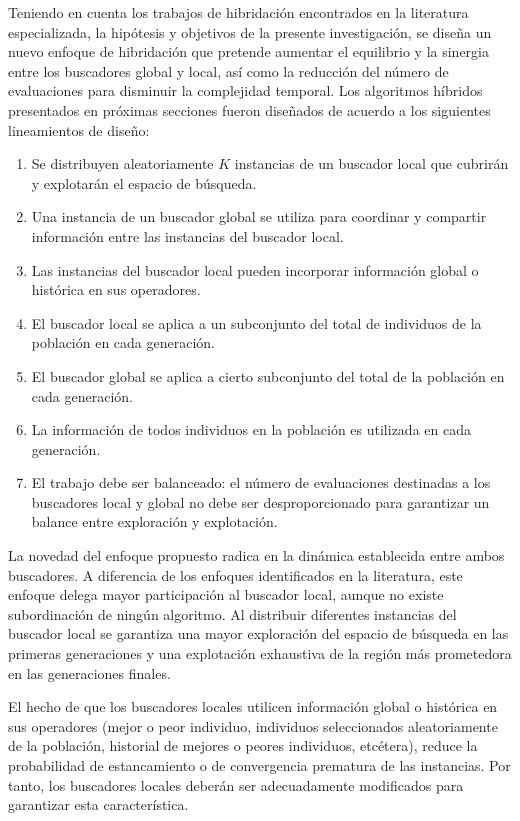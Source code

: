 Teniendo en cuenta los trabajos de hibridación encontrados en la literatura especializada, la hipótesis y objetivos de la presente investigación, se diseña un nuevo enfoque de hibridación que pretende aumentar el equilibrio y la sinergia entre los buscadores global y local, así como la reducción del número de evaluaciones para disminuir la complejidad temporal. Los algoritmos híbridos presentados en próximas secciones fueron diseñados de acuerdo a los siguientes lineamientos de diseño:
\begin{enumerate}
\item Se distribuyen aleatoriamente $K$ instancias de un buscador local que cubrirán y explotarán el espacio de búsqueda.
\item Una instancia de un buscador global se utiliza para coordinar y compartir información entre las instancias del buscador local.
\item Las instancias del buscador local pueden incorporar información global o histórica en sus operadores.
\item El buscador local se aplica a un subconjunto del total de individuos de la población en cada generación.
\item El buscador global se aplica a cierto subconjunto del total de la población en cada generación.
\item La información de todos individuos en la población es utilizada en cada generación.
\item El trabajo debe ser balanceado: el número de evaluaciones destinadas a los buscadores local y global no debe ser desproporcionado para garantizar un balance entre exploración y explotación.
\end{enumerate}
\newpage
La novedad del enfoque propuesto radica en la dinámica establecida entre ambos buscadores. A diferencia de los enfoques identificados en la literatura, este enfoque delega mayor participación al buscador local, aunque no existe subordinación de ningún algoritmo. Al distribuir diferentes instancias del buscador local se garantiza una mayor exploración del espacio de búsqueda en las primeras generaciones y una explotación exhaustiva de la región más prometedora en las generaciones finales.

El hecho de que los buscadores locales utilicen información global o histórica en sus operadores (mejor o peor individuo, individuos seleccionados aleatoriamente de la población, historial de mejores o peores individuos, etcétera), reduce la probabilidad de estancamiento o de convergencia prematura de las instancias. Por tanto, los buscadores locales deberán ser adecuadamente modificados para garantizar esta característica. 

